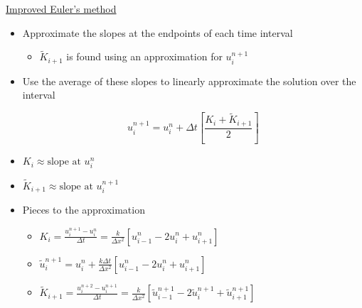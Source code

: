 \documentclass[compress]{beamer}
\begin{document}
 	

\begin{frame}
\begin{center}
\underline{Improved Euler's method} 
\end{center}
\begin{itemize}
\item Approximate the slopes at the endpoints of each time interval
\begin{itemize}
\item $\widetilde{K}_{i+1}$ is found using an approximation for $u_i^{n+1}$
\end{itemize}
\item Use the average of these slopes to linearly approximate the solution over the interval


$$u_i^{n+1}=u_i^n+\Delta t\left[\frac{K_{i}+\widetilde{K}_{i+1} }{2}\right]$$
\item $K_{i}\approx \text{slope at $u_i^n$}$
\item $\widetilde{K}_{i+1}\approx \text{slope at $u_i^{n+1}$}$
\end{itemize}
\end{frame}

\begin{frame}
\begin{itemize}
\item Pieces to the approximation
\vspace{.2in}

\begin{itemize}
\item $K_{i}=\frac{u_i^{n+1}-u_i^n}{\Delta t}=\frac{k}{\Delta x^2}\left[u_{i-1}^n-2u_i^n+u_{i+1}^n\right]$
\vspace{.2in}

\item $\tilde{u}_i^{n+1}=u_i^{n}+\frac{k\Delta t}{\Delta x^2}\left[u_{i-1}^n-2u_i^n+u_{i+1}^n\right]$
\vspace{.2in}

\item $\widetilde{K}_{i+1}=\frac{u_{i}^{n+2}-u_i^{n+1}}{\Delta t}=\frac{k}{\Delta x^2}\left[\tilde{u}_{i-1}^{n+1}-2\tilde{u}_i^{n+1}+\tilde{u}_{i+1}^{n+1}\right]$
\end{itemize}
\end{itemize}
\end{frame}
\end{document}
